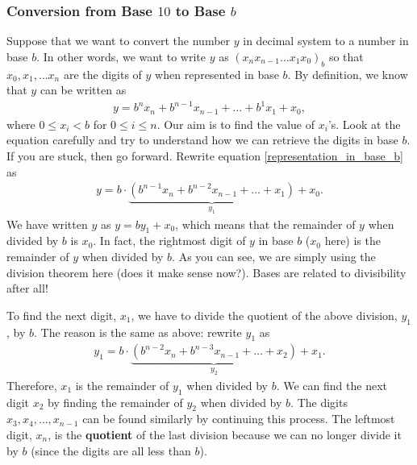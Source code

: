 \documentclass{subfile}
\begin{document}
	\subsubsection{Conversion from Base $10$ to Base $b$}
	Suppose that we want to convert the number $y$ in decimal system to a number in base $b$. In other words, we want to write $y$ as $(x_{n}x_{n-1}\dots x_1x_0)_b$ so that $x_0, x_1, \dots x_n$ are the digits of $y$ when represented in base $b$. By definition, we know that $y$ can be written as
	\begin{align}\label{representation_in_base_b}
		y = b^{n} x_{n} + b^{n-1} x_{n-1} + \dots + b^1x_1 + x_0,
	\end{align}
	where $0 \leq x_i < b$ for $0 \leq i \leq n$. Our aim is to find the value of $x_i$'s. Look at the equation carefully and try to understand how we can retrieve the digits in base $b$. If you are stuck, then go forward. Rewrite equation \eqref{representation_in_base_b} as
	\begin{align*}
		y = b \cdot \underbrace{\left( b^{n-1} x_{n} + b^{n-2} x_{n-1} + \dots + x_1  \right)}_{y_1} + x_0.
	\end{align*}
	We have written $y$ as $y=by_1 + x_0$, which means that the remainder of $y$ when divided by $b$ is $x_0$. In fact, the rightmost digit of $y$ in base $b$ ($x_0$ here) is the remainder of $y$ when divided by $b$. As you can see, we are simply using the division theorem here (does it make sense now?). Bases are related to divisibility after all!

	To find the next digit, $x_1$, we have to divide the quotient of the above division, $y_1$, by $b$. The reason is the same as above: rewrite $y_1$ as
	\begin{align*}
		y_1 = b \cdot \underbrace{\left( b^{n-2} x_{n} + b^{n-3} x_{n-1} + \dots + x_2  \right)}_{y_2} + x_1.
	\end{align*}
	Therefore, $x_1$ is the remainder of $y_1$ when divided by $b$. We can find the next digit $x_2$ by finding the remainder of $y_2$ when divided by $b$. The digits $x_3, x_4, \dots, x_{n-1}$ can be found similarly by continuing this process. The leftmost digit, $x_n$, is the \textbf{quotient} of the last division because we can no longer divide it by $b$ (since the digits are all less than $b$).
\end{document}
